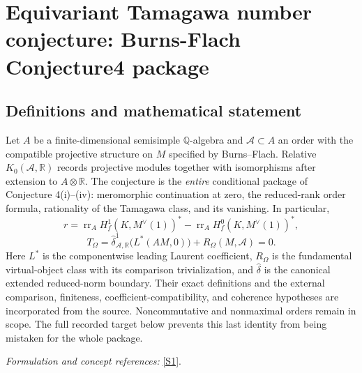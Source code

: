 \documentclass[11pt,a4paper]{article}
\newcommand{\Q}{\mathbb{Q}}
\newcommand{\R}{\mathbb{R}}
\newcommand{\sref}[2]{\hyperlink{source:#1:#2}{[S#2]}}
\numberwithin{equation}{section}
\begin{document}
\setcounter{section}{0}
\clearpage
\section*{\texorpdfstring{Equivariant Tamagawa number conjecture: Burns-Flach Conjecture4 package}{Equivariant Tamagawa number conjecture: Burns-Flach Conjecture4 package}}\label{30006700}
\subsection{Definitions and mathematical statement}
Let $A$ be a finite-dimensional semisimple $\Q$-algebra and $\mathcal A\subset A$ an order with the compatible projective structure on $M$ specified by Burns--Flach. Relative $K_0(\mathcal A,\R)$ records projective modules together with isomorphisms after extension to $A\otimes\R$. The conjecture is the \emph{entire} conditional package of Conjecture 4(i)--(iv): meromorphic continuation at zero, the reduced-rank order formula, rationality of the Tamagawa class, and its vanishing. In particular,
\[
 r=\operatorname{rr}_A H_f^1(K,M^\vee(1))^*
   -\operatorname{rr}_A H_f^0(K,M^\vee(1))^*,
\]
\[
 T_\Omega=\widehat\delta^1_{\mathcal A,\R}\bigl(L^*(AM,0)\bigr)
             +R_\Omega(M,\mathcal A)=0.
\]
Here $L^*$ is the componentwise leading Laurent coefficient, $R_\Omega$ is the fundamental virtual-object class with its comparison trivialization, and $\widehat\delta$ is the canonical extended reduced-norm boundary. Their exact definitions and the external comparison, finiteness, coefficient-compatibility, and coherence hypotheses are incorporated from the source. Noncommutative and nonmaximal orders remain in scope. The full recorded target below prevents this last identity from being mistaken for the whole package.
\par\smallskip\textit{Formulation and concept references:} \sref{30006700}{1}.
\end{document}
